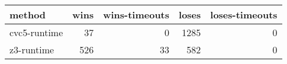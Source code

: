 \begin{tabular}{lrrrr}
\hline
 method       &   wins &   wins-timeouts &   loses &   loses-timeouts \\
\hline
 cvc5-runtime &     37 &               0 &    1285 &                0 \\
 z3-runtime   &    526 &              33 &     582 &                0 \\
\hline
\end{tabular}
